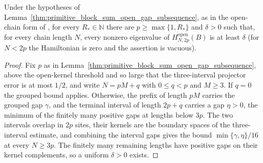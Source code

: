 \begin{lemma}
    \label{thm:primitive_block_sum_open_gap_all_lengths}
    \leanok
    Under the hypotheses of
    Lemma~\ref{thm:primitive_block_sum_open_gap_subsequence}, as in the
    open-chain form of \cite[Theorem~1.2]{Nachtergaele1996Spectral}, for every
    $R_*\in\mathbb N$ there are $p\geq\max\{1,R_*\}$ and $\delta>0$ such
    that, for every chain length $N$, every nonzero eigenvalue of
    $H^{\mathrm{open}}_{N,2p}(B)$ is at least $\delta$ (for $N<2p$ the
    Hamiltonian is zero and the assertion is vacuous).
\end{lemma}
\begin{proof}
    \leanok
    Fix $p$ as in
    Lemma~\ref{thm:primitive_block_sum_open_gap_subsequence}, above the
    open-kernel threshold and so large that the three-interval projector
    error is at most $1/2$, and write $N=pM+q$ with $0\leq q<p$ and $M\geq3$.
    If $q=0$ the grouped bound applies. Otherwise, the prefix of length
    $pM$ carries the grouped gap $\gamma$, and the terminal interval of
    length $2p+q$ carries a gap $\eta>0$, the minimum of the finitely many
    positive gaps at lengths below $3p$. The two intervals overlap in $2p$
    sites, their kernels are the boundary spaces of the three-interval
    estimate, and combining the interval gaps gives the bound
    $\min\{\gamma,\eta\}/16$ at every $N\geq3p$. The finitely many
    remaining lengths have positive gaps on their kernel complements, so a
    uniform $\delta>0$ exists.
\end{proof}

